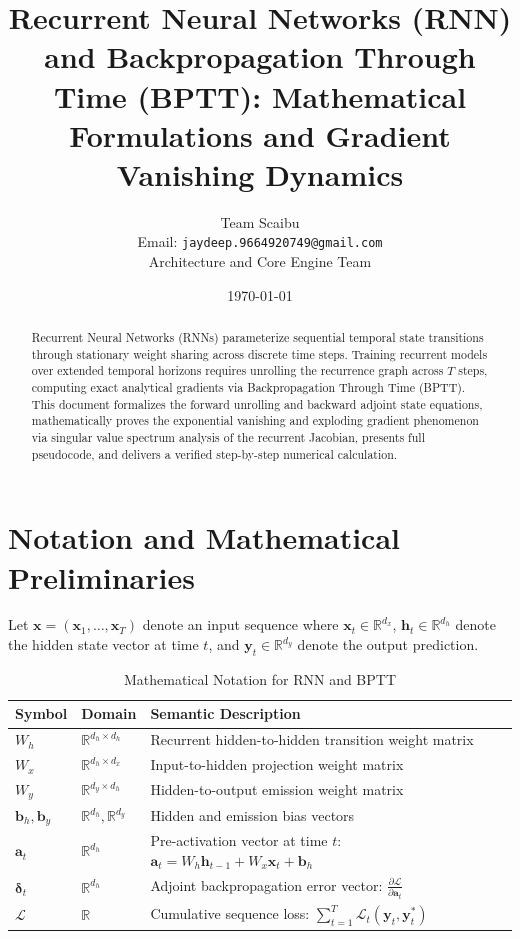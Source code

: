 \documentclass[11pt,a4paper]{article}
\title{Recurrent Neural Networks (RNN) and Backpropagation Through Time (BPTT): Mathematical Formulations and Gradient Vanishing Dynamics}
\author{Team Scaibu \\ \small Email: \texttt{jaydeep.9664920749@gmail.com} \\ \small Architecture and Core Engine Team}
\date{\today}
\theoremstyle{definition}
\begin{document}
\maketitle

\begin{abstract}
Recurrent Neural Networks (RNNs) parameterize sequential temporal state transitions through stationary weight sharing across discrete time steps. Training recurrent models over extended temporal horizons requires unrolling the recurrence graph across $T$ steps, computing exact analytical gradients via Backpropagation Through Time (BPTT). This document formalizes the forward unrolling and backward adjoint state equations, mathematically proves the exponential vanishing and exploding gradient phenomenon via singular value spectrum analysis of the recurrent Jacobian, presents full pseudocode, and delivers a verified step-by-step numerical calculation.
\end{abstract}

\section{Notation and Mathematical Preliminaries}

Let $\mathbf{x} = (\mathbf{x}_1, \dots, \mathbf{x}_T)$ denote an input sequence where $\mathbf{x}_t \in \mathbb{R}^{d_x}$, $\mathbf{h}_t \in \mathbb{R}^{d_h}$ denote the hidden state vector at time $t$, and $\mathbf{y}_t \in \mathbb{R}^{d_y}$ denote the output prediction.

\begin{table}[h]
\centering
\caption{Mathematical Notation for RNN and BPTT}
\begin{tabular}{lll}
\toprule
\textbf{Symbol} & \textbf{Domain} & \textbf{Semantic Description} \\
\midrule
$W_h$ & $\mathbb{R}^{d_h \times d_h}$ & Recurrent hidden-to-hidden transition weight matrix \\
$W_x$ & $\mathbb{R}^{d_h \times d_x}$ & Input-to-hidden projection weight matrix \\
$W_y$ & $\mathbb{R}^{d_y \times d_h}$ & Hidden-to-output emission weight matrix \\
$\mathbf{b}_h, \mathbf{b}_y$ & $\mathbb{R}^{d_h}, \mathbb{R}^{d_y}$ & Hidden and emission bias vectors \\
$\mathbf{a}_t$ & $\mathbb{R}^{d_h}$ & Pre-activation vector at time $t$: $\mathbf{a}_t = W_h \mathbf{h}_{t-1} + W_x \mathbf{x}_t + \mathbf{b}_h$ \\
$\boldsymbol{\delta}_t$ & $\mathbb{R}^{d_h}$ & Adjoint backpropagation error vector: $\frac{\partial \mathcal{L}}{\partial \mathbf{a}_t}$ \\
$\mathcal{L}$ & $\mathbb{R}$ & Cumulative sequence loss: $\sum_{t=1}^T \mathcal{L}_t(\mathbf{y}_t, \mathbf{y}_t^*)$ \\
\bottomrule
\end{tabular}
\end{table}
\end{document}
